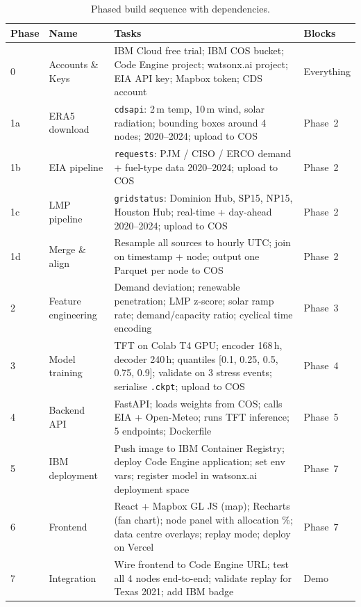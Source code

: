 \documentclass[10pt,letterpaper]{article}
\newcommand{\tft}{\textsc{TFT}\xspace}
\begin{document}
\begin{table}[H]
\centering
\caption{Phased build sequence with dependencies.}
\label{tab:phases}
\renewcommand{\arraystretch}{1.3}
\begin{tabularx}{\linewidth}{@{}llXl@{}}
\toprule
\textbf{Phase} & \textbf{Name} & \textbf{Tasks} & \textbf{Blocks} \\
\midrule
0 & Accounts \& Keys
  & IBM Cloud free trial; IBM COS bucket; Code Engine project;
    watsonx.ai project; EIA API key; Mapbox token; CDS account
  & Everything \\
\midrule
1a & ERA5 download
   & \texttt{cdsapi}: 2\,m temp, 10\,m wind, solar radiation; bounding
     boxes around 4 nodes; 2020--2024; upload to COS
   & Phase~2 \\
1b & EIA pipeline
   & \texttt{requests}: PJM / CISO / ERCO demand + fuel-type
     data 2020--2024; upload to COS
   & Phase~2 \\
1c & LMP pipeline
   & \texttt{gridstatus}: Dominion Hub, SP15, NP15, Houston Hub;
     real-time + day-ahead 2020--2024; upload to COS
   & Phase~2 \\
1d & Merge \& align
   & Resample all sources to hourly UTC; join on timestamp + node;
     output one Parquet per node to COS
   & Phase~2 \\
\midrule
2 & Feature engineering
  & Demand deviation; renewable penetration; LMP z-score; solar
    ramp rate; demand/capacity ratio; cyclical time encoding
  & Phase~3 \\
\midrule
3 & Model training
  & \tft on Colab T4 GPU; encoder 168\,h, decoder 240\,h; quantiles
    [0.1, 0.25, 0.5, 0.75, 0.9]; validate on 3 stress events;
    serialise \texttt{.ckpt}; upload to COS
  & Phase~4 \\
\midrule
4 & Backend API
  & FastAPI; loads weights from COS; calls EIA + Open-Meteo;
    runs \tft inference; 5 endpoints; Dockerfile
  & Phase~5 \\
\midrule
5 & IBM deployment
  & Push image to IBM Container Registry; deploy Code Engine
    application; set env vars; register model in watsonx.ai
    deployment space
  & Phase~7 \\
\midrule
6 & Frontend
  & React + Mapbox GL JS (map); Recharts (fan chart); node
    panel with allocation \%; data centre overlays; replay mode;
    deploy on Vercel
  & Phase~7 \\
\midrule
7 & Integration
  & Wire frontend to Code Engine URL; test all 4 nodes end-to-end;
    validate replay for Texas 2021; add IBM badge
  & Demo \\
\bottomrule
\end{tabularx}
\end{table}
\end{document}
